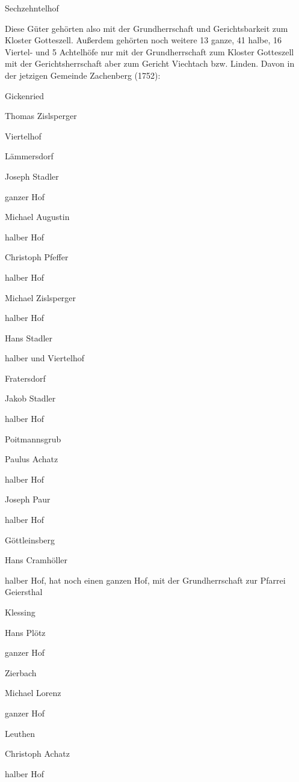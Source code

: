 Sechzehntelhof



Diese Güter gehörten also mit der Grundherrschaft und Gerichtsbarkeit zum
Kloster Gotteszell. Außerdem gehörten noch weitere 13 ganze, 41 halbe, 16
Viertel- und 5 Achtelhöfe nur mit der Grundherrschaft zum Kloster Gotteszell mit
der Gerichtsherrschaft aber zum Gericht Viechtach bzw. Linden. Davon in der
jetzigen Gemeinde Zachenberg (1752):



Gickenried

Thomas Zislsperger

Viertelhof

Lämmersdorf

Joseph Stadler

ganzer Hof



Michael Augustin

halber Hof



Christoph Pfeffer

halber Hof



Michael Zislsperger

halber Hof



Hans Stadler

halber und Viertelhof

Fratersdorf

Jakob Stadler

halber Hof

Poitmannsgrub

Paulus Achatz

halber Hof



Joseph Paur

halber Hof

Göttleinsberg

Hans Cramhöller

halber Hof, hat noch einen ganzen Hof, mit der Grundherrschaft zur Pfarrei
Geiersthal

Klessing

Hans Plötz

ganzer Hof

Zierbach

Michael Lorenz

ganzer Hof

Leuthen

Christoph Achatz

halber Hof

